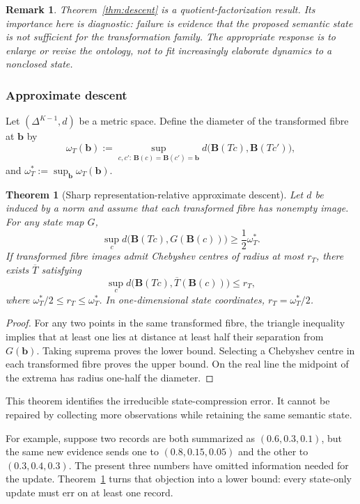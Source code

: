 \documentclass[11pt]{article}
\newtheorem{theorem}[definition]{Theorem}
\newtheorem{remark}[definition]{Remark}
\newcommand{\Bmap}{\mathbf B}
\begin{document}
\begin{remark}
Theorem~\ref{thm:descent} is a quotient-factorization result. Its importance here is diagnostic: failure is evidence that the proposed semantic state is not sufficient for the transformation family. The appropriate response is to enlarge or revise the ontology, not to fit increasingly elaborate dynamics to a nonclosed state.
\end{remark}

\subsubsection{Approximate descent}

Let $(\Delta^{K-1},d)$ be a metric space. Define the diameter of the transformed fibre at $\bm b$ by
\[
 \omega_T(\bm b):=\sup_{c,c':\,\Bmap(c)=\Bmap(c')=\bm b}
 d\bigl(\Bmap(Tc),\Bmap(Tc')\bigr),
\]
and $\omega_T^*:=\sup_{\bm b}\omega_T(\bm b)$.

\begin{theorem}[Sharp representation-relative approximate descent]\label{thm:approx}
Let $d$ be induced by a norm and assume that each transformed fibre has nonempty image. For any state map $G$,
\[
 \sup_c d\bigl(\Bmap(Tc),G(\Bmap(c))\bigr)\ge \frac{1}{2}\omega_T^*.
\]
If transformed fibre images admit Chebyshev centres of radius at most $r_T$, there exists $\overline T$ satisfying
\[
 \sup_c d\bigl(\Bmap(Tc),\overline T(\Bmap(c))\bigr)\le r_T,
\]
where $\omega_T^*/2\le r_T\le\omega_T^*$. In one-dimensional state coordinates, $r_T=\omega_T^*/2$.
\end{theorem}

\begin{proof}
For any two points in the same transformed fibre, the triangle inequality implies that at least one lies at distance at least half their separation from $G(\bm b)$. Taking suprema proves the lower bound. Selecting a Chebyshev centre in each transformed fibre proves the upper bound. On the real line the midpoint of the extrema has radius one-half the diameter.
\end{proof}

This theorem identifies the irreducible state-compression error. It cannot be repaired by collecting more observations while retaining the same semantic state.

For example, suppose two records are both summarized as
$(0.6,0.3,0.1)$, but the same new evidence sends one to
$(0.8,0.15,0.05)$ and the other to $(0.3,0.4,0.3)$.  The present three
numbers have omitted information needed for the update.
Theorem~\ref{thm:approx} turns that objection into a lower bound: every
state-only update must err on at least one record.
\end{document}

